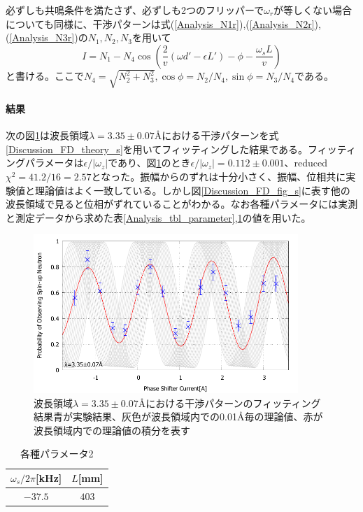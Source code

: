 必ずしも共鳴条件を満たさず、必ずしも2つのフリッパーで$\omega_r$が等しくない場合についても同様に、干渉パターンは式(\ref{Analysis_N1r}),(\ref{Analysis_N2r}),(\ref{Analysis_N3r})の$N_1,N_2,N_3$を用いて
\begin{equation}
I=N_1-N_4\cos\left(\frac{2}{v} (\omega d' -\epsilon L') -\phi -\frac{\omega_s L}{v} \right)\label{Discussion_FD_theory_s}
\end{equation}
と書ける。ここで$N_4=\sqrt{N_2^2+N_3^2},\cos\phi=N_2/N_4,\sin\phi=N_3/N_4$である。

\paragraph{結果}
次の図\ref{Discussion_FD_fig_s_470}は波長領域$\lambda=3.35\pm0.07$\AA における干渉パターンを式\ref{Discussion_FD_theory_s}を用いてフィッティングした結果である。フィッティングパラメータは$\epsilon/|\omega_z|$であり、図\ref{Discussion_FD_fig_s_470}のとき$\epsilon/|\omega_z|=0.112\pm0.001$、reduced$\chi^2=41.2/16=2.57$となった。振幅からのずれは十分小さく、振幅、位相共に実験値と理論値はよく一致している。しかし図\ref{Discussion_FD_fig_s}に表す他の波長領域で見ると位相がずれていることがわかる。なお各種パラメータには実測と測定データから求めた表\ref{Analysis_tbl_parameter},\ref{Discussion_FD_tbl_parameter}の値を用いた。
\begin{figure}[h]
\centering
\includegraphics[width=10cm]{discussion/FD/IT_s_470.pdf}
\caption{波長領域$\lambda=3.35\pm0.07$\AA における干渉パターンのフィッティング結果\newline 青が実験結果、灰色が波長領域内での0.01\AA 毎の理論値、赤が波長領域内での理論値の積分を表す}\label{Discussion_FD_fig_s_470}
\end{figure}

\begin{table}[h]
\centering
\caption{各種パラメータ2}\label{Discussion_FD_tbl_parameter}
\begin{tabular}{cc}
$\omega_s/2\pi$[kHz]&$L$[mm]\\ \hline
$-37.5$&$403$
\end{tabular}
\end{table}

